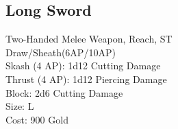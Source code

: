 \subsection{Long Sword}\label{weapon:longSword}
Two-Handed Melee Weapon,  Reach, ST\\
Draw/Sheath(6AP/10AP)\\
Skash (4 AP): 1d12 Cutting Damage\\
Thrust (4 AP): 1d12 Piercing Damage\\
Block: 2d6 Cutting Damage\\
Size: L\\
Cost: 900 Gold\\
